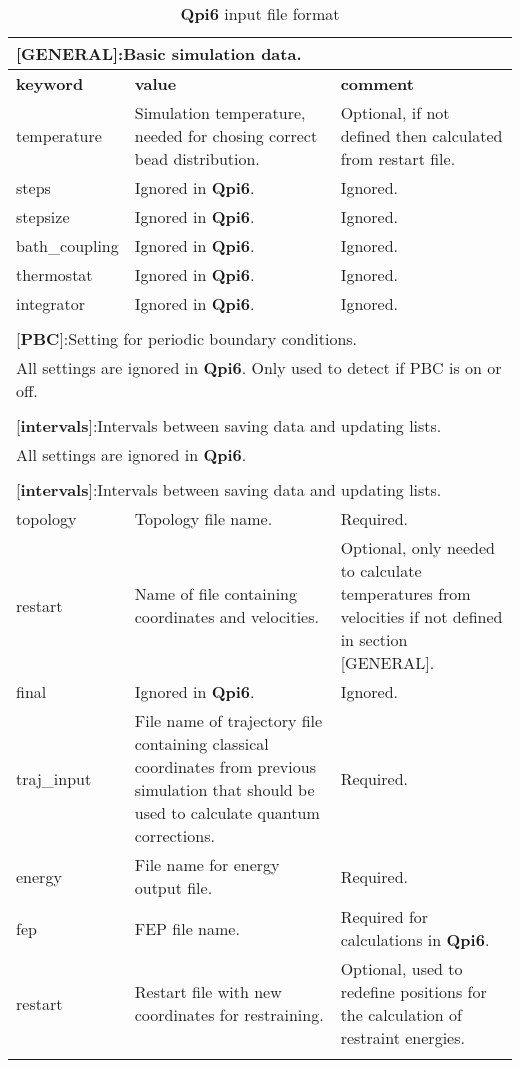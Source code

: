 \documentclass[a4paper,11pt]{article}
\begin{document}
\begin{longtable}{|p{78pt}|p{158pt}|p{158pt}|}
\caption{\textbf{Qpi6} input file format}
\label{tab:qpiinputfileformat}
\endhead

\multicolumn{3}{p{394pt}}{[\textbf{GENERAL}]:Basic simulation data.}\\
\hline \textbf{keyword} & \textbf{value} & \textbf{comment}\\
\hline temperature & Simulation temperature, needed for chosing correct bead distribution. & Optional, if not defined then calculated from restart file.\\
\hline steps & Ignored in \textbf{Qpi6}. & Ignored. \\
\hline stepsize & Ignored in \textbf{Qpi6}. & Ignored. \\
	\hline bath{\_}coupling & Ignored in \textbf{Qpi6}. & Ignored. \\
	\hline thermostat & Ignored in \textbf{Qpi6}. & Ignored. \\
	\hline integrator & Ignored in \textbf{Qpi6}. & Ignored. \\
	\hline
\multicolumn{3}{p{394pt}}{}\\
\multicolumn{3}{p{394pt}}{[\textbf{PBC}]:Setting for periodic boundary conditions.}\\
\hline
\multicolumn{3}{p{394pt}}{All settings are ignored in \textbf{Qpi6}. Only used to detect if PBC is on or off.}\\
\hline
\multicolumn{3}{p{394pt}}{}\\
\multicolumn{3}{p{394pt}}{[\textbf{intervals}]:Intervals between saving data and updating lists.}\\
\hline
\multicolumn{3}{p{394pt}}{All settings are ignored in \textbf{Qpi6}.}\\
\hline
\multicolumn{3}{p{394pt}}{}\\
\multicolumn{3}{p{394pt}}{[\textbf{intervals}]:Intervals between saving data and updating lists.}\\
	\hline topology & Topology file name. & Required. \\
	\hline restart & Name of file containing coordinates and velocities. & Optional, only needed to calculate temperatures from velocities if not defined in section [GENERAL].\\
	\hline final & Ignored in \textbf{Qpi6}. & Ignored. \\
	\hline traj{\_}input & File name of trajectory file containing classical coordinates from previous simulation that should be used to calculate quantum corrections. & Required. \\
	\hline energy & File name for energy output file. & Required.\\
	\hline fep & FEP file name. & Required for calculations in \textbf{Qpi6}. \\
	\hline restart & Restart file with new coordinates for restraining. & Optional, used to redefine positions for the calculation of restraint energies.\\
	\hline

\multicolumn{3}{p{394pt}}{}\\
\hline
\end{longtable}
\end{document}
